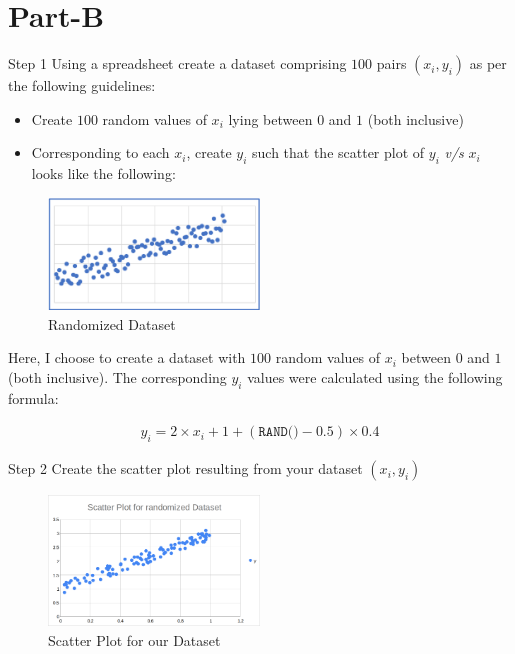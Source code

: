 \section{Part-B}

\begin{custombox}[label={box:step1}]{Step 1}
	Using a spreadsheet create a dataset comprising $100$ pairs $(x_i, y_i)$ as per the following guidelines:

	\begin{itemize}
		\item Create $100$ random values of $x_i$ lying between $0$ and $1$ (both inclusive)
		\item Corresponding to each $x_i$, create $y_i$ such that the scatter plot of $y_i$ \textit{v/s} $x_i$ looks like the following:
	\end{itemize}

	\begin{figure}[H]
		\centering
		\includegraphics[width=0.5\textwidth]{Images/Step1.png}
		\caption{Randomized Dataset}
	\end{figure}
\end{custombox}

Here, I choose to create a dataset with $100$ random values of $x_i$ between $0$ and $1$ (both inclusive). The corresponding $y_i$ values were calculated using the following formula:

\begin{align}
	y_i = 2 \times x_i + 1 + (\texttt{RAND()} - 0.5) \times 0.4
\end{align}


\begin{custombox}[label={box:step2}]{Step 2}
	Create the scatter plot resulting from your dataset $(x_i, y_i)$
\end{custombox}

\begin{figure}[H]
	\centering
	\includegraphics[width=0.5\textwidth]{Images/Step2.png}
	\caption{Scatter Plot for our Dataset}
\end{figure}

